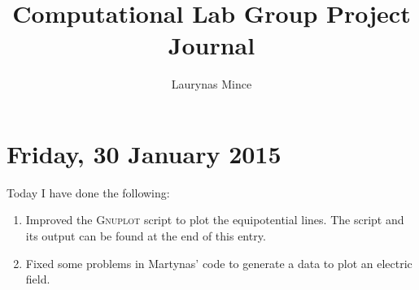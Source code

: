 \documentclass[12pt]{article}
\title{Computational Lab Group Project\\Journal}
\author{Laurynas Mince}
\begin{document}
\maketitle

\section*{Friday, 30 January 2015}

Today I have done the following:
\begin{enumerate}
	\item Improved the \textsc{Gnuplot} script to plot the equipotential lines. The script and its output can be found at the end of this entry.
	\item Fixed some problems in Martynas' code to generate a data to plot an electric field. 
\end{enumerate}
\end{document}
